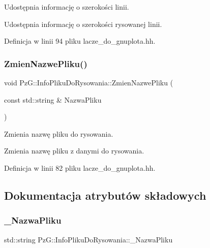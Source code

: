 Udostępnia informację o szerokości linii. 

Udostępnia informację o szerokości rysowanej linii. 

Definicja w linii 94 pliku lacze\+\_\+do\+\_\+gnuplota.\+hh.

\mbox{\label{class_pz_g_1_1_info_pliku_do_rysowania_ae734c69f5cecf9c0584e3a7f433340ea}} 
\subsubsection{\texorpdfstring{Zmien\+Nazwe\+Pliku()}{ZmienNazwePliku()}}
{\footnotesize\ttfamily void Pz\+G\+::\+Info\+Pliku\+Do\+Rysowania\+::\+Zmien\+Nazwe\+Pliku (\begin{DoxyParamCaption}\item[{const std\+::string \&}]{Nazwa\+Pliku }\end{DoxyParamCaption})\hspace{0.3cm}{\ttfamily [inline]}}



Zmienia nazwę pliku do rysowania. 

Zmienia nazwę pliku z danymi do rysowania. 

Definicja w linii 82 pliku lacze\+\_\+do\+\_\+gnuplota.\+hh.



\subsection{Dokumentacja atrybutów składowych}
\mbox{\label{class_pz_g_1_1_info_pliku_do_rysowania_a07ab06c56b9c3179e566a4123ab2a037}} 
\subsubsection{\texorpdfstring{\+\_\+\+Nazwa\+Pliku}{\_NazwaPliku}}
{\footnotesize\ttfamily std\+::string Pz\+G\+::\+Info\+Pliku\+Do\+Rysowania\+::\+\_\+\+Nazwa\+Pliku\hspace{0.3cm}{\ttfamily [private]}}



